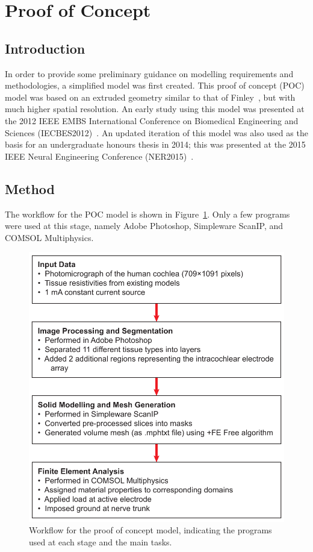 
\section{Proof of Concept}

\subsection{Introduction}

In order to provide some preliminary guidance on modelling requirements and
methodologies, a simplified model was first created. This proof of concept (POC)
model was based on an extruded geometry similar to that of
Finley~\cite{finley1989}, but with much higher spatial resolution. An early
study using this model was presented at the 2012 IEEE EMBS International
Conference on Biomedical Engineering and Sciences (IECBES2012)~\cite{wong2012}.
An updated iteration of this model was also used as the basis for an
undergraduate honours thesis in 2014; this was presented at the 2015 IEEE Neural
Engineering Conference (NER2015)~\cite{inguva2015ner}.

\subsection{Method}

The workflow for the POC model is shown in Figure~\ref{fig:workflow_poc}. Only a
few programs were used at this stage, namely Adobe Photoshop, Simpleware ScanIP,
and COMSOL Multiphysics.

\begin{figure}
	\centering
	\includegraphics[width=11.8cm]{Methodology/workflow_poc}
	\caption[Workflow for the proof of concept model]{Workflow for the proof of
	concept model, indicating the programs used at each stage and the main tasks.}
	\label{fig:workflow_poc}
\end{figure}

